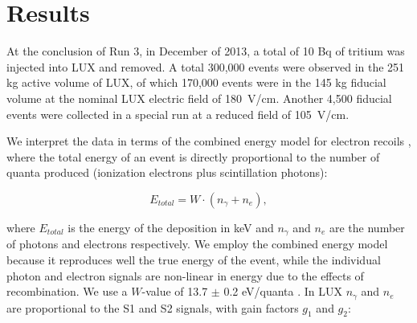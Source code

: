 \section{Results}

At the conclusion of Run 3, in December of 2013, a total of 10 Bq of tritium was injected into LUX and removed. A total 300,000 events were observed in the 251 kg active volume of LUX, of which 170,000 events were in the 145 kg fiducial volume at the nominal LUX electric field of 180~V/cm. Another 4,500 fiducial events were collected in a special run at a reduced field of 105~V/cm. 


We interpret the data in terms of the combined energy model for electron recoils \cite{Platzman}, where the total energy of an event is directly proportional to the number of quanta produced (ionization electrons plus scintillation photons):

\begin{equation}
E_{total} = W \cdot (n_{\gamma} + n_e ),
\label{platzman_eq}
\end{equation}

\noindent
where $E_{total}$ is the energy of the deposition in keV and  $n_\gamma$ and $n_e$ are the number of photons and electrons respectively. We employ the combined energy model because it reproduces well the true energy of the event, while the individual photon and electron signals are non-linear in energy due to the effects of recombination. We use a $W$-value of 13.7 $\pm$ 0.2 eV/quanta \cite{Dahl_Thesis}. In LUX $n_{\gamma}$ and $n_e$ are proportional to the S1 and S2 signals, with gain factors $g_1$ and $g_2$: 


